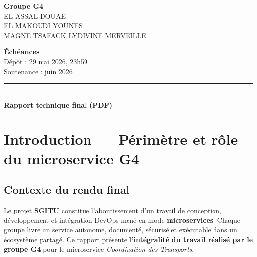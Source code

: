 \documentclass[12pt,a4paper]{report}
\begin{document}
\begin{titlepage}
\begin{center}
        \vspace{1cm}
        \begin{minipage}[t]{0.48\textwidth}
            \textbf{Groupe G4}\\[0.25cm]
            EL ASSAL DOUAE\\
            EL MAKOUDI YOUNES\\
            MAGNE TSAFACK LYDIVINE MERVEILLE\\
        \end{minipage}
        \hfill
        \begin{minipage}[t]{0.48\textwidth}
            \raggedleft
            \textbf{Échéances}\\[0.25cm]
            Dépôt : 29 mai 2026, 23h59\\
            Soutenance : juin 2026\\
        \end{minipage}

        \vfill
        \rule{\textwidth}{1pt}\\
        {\normalsize \textbf{Rapport technique final (PDF)}}
    \end{center}
\end{titlepage}

\tableofcontents
\newpage

\chapter{Introduction — Périmètre et rôle du microservice G4}

\section{Contexte du rendu final}
Le projet \textbf{SGITU} constitue l'aboutissement d'un travail de conception, développement et intégration DevOps mené en mode \textbf{microservices}. Chaque groupe livre un service autonome, documenté, sécurisé et exécutable dans un écosystème partagé. Ce rapport présente \textbf{l'intégralité du travail réalisé par le groupe G4} pour le microservice \textit{Coordination des Transports}.
\end{document}
